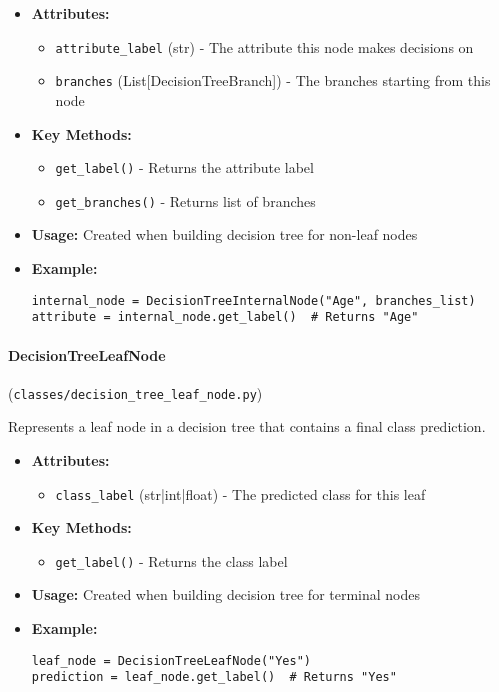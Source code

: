 \documentclass[
english,
smallborders
]{i6prcsht}
\begin{document}
\begin{itemize}
	\item \textbf{Attributes:}
	      \begin{itemize}
		      \item \texttt{attribute\_label} (str) - The attribute this node makes decisions on
		      \item \texttt{branches} (List[DecisionTreeBranch]) - The branches starting from this node
	      \end{itemize}
	\item \textbf{Key Methods:}
	      \begin{itemize}
		      \item \texttt{get\_label()} - Returns the attribute label
		      \item \texttt{get\_branches()} - Returns list of branches
	      \end{itemize}
	\item \textbf{Usage:} Created when building decision tree for non-leaf nodes
	\item \textbf{Example:}
	      \begin{lstlisting}
internal_node = DecisionTreeInternalNode("Age", branches_list)
attribute = internal_node.get_label()  # Returns "Age"
    \end{lstlisting}
\end{itemize}

\vspace*{0.3cm}

\paragraph{DecisionTreeLeafNode} (\texttt{classes/decision\_tree\_leaf\_node.py})

Represents a leaf node in a decision tree that contains a final class prediction.

\begin{itemize}
	\item \textbf{Attributes:}
	      \begin{itemize}
		      \item \texttt{class\_label} (str|int|float) - The predicted class for this leaf
	      \end{itemize}
	\item \textbf{Key Methods:}
	      \begin{itemize}
		      \item \texttt{get\_label()} - Returns the class label
	      \end{itemize}
	\item \textbf{Usage:} Created when building decision tree for terminal nodes
	\item \textbf{Example:}
	      \begin{lstlisting}
leaf_node = DecisionTreeLeafNode("Yes")
prediction = leaf_node.get_label()  # Returns "Yes"
    \end{lstlisting}
\end{itemize}
\end{document}
